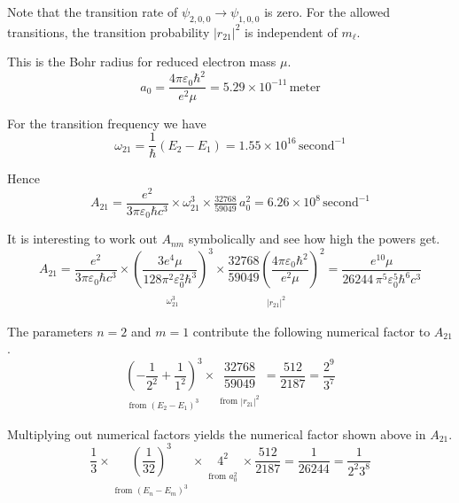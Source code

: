 \documentclass[12pt]{article}
\begin{document}
\medskip
\noindent
Note that the transition rate of $\psi_{2,0,0}\rightarrow\psi_{1,0,0}$ is zero.
For the allowed transitions, the transition probability
$|r_{21}|^2$ is independent of $m_\ell$.

\bigskip
\noindent
This is the Bohr radius for reduced electron mass $\mu$.
\begin{equation*}
a_0=\frac{4\pi\varepsilon_0\hbar^2}{e^2 \mu}
=5.29\times10^{-11}\,\text{meter}
\end{equation*}

\bigskip
\noindent
For the transition frequency we have
\begin{equation*}
\omega_{21}=\frac{1}{\hbar}(E_2-E_1)
=1.55\times10^{16}\,\text{second}^{-1}
\end{equation*}

\noindent
Hence
\begin{equation*}
A_{21}=\frac{e^2}{3\pi\varepsilon_0\hbar c^3}
\times
\omega_{21}^3
\times
\tfrac{32768}{59049}\,a_0^2
=6.26\times10^8\,\text{second}^{-1}
\end{equation*}

\noindent
It is interesting to work out $A_{nm}$ symbolically and see how high the powers get.
\begin{equation*}
A_{21}=\frac{e^2}{3\pi\varepsilon_0\hbar c^3}
\times
\underset{\substack{\\[1ex]\omega_{21}^3}}
{\left(\frac{3e^4\mu}{128\pi^2\varepsilon_0^2\hbar^3}\right)^3}
\times
\underset{\substack{\\[1ex]|r_{21}|^2}}
{\frac{32768}{59049}
\left(\frac{4\pi\varepsilon_0\hbar^2}{e^2\mu}\right)^2}
=\frac{e^{10}\mu}{26244\,\pi^5\varepsilon_0^5\hbar^6 c^3}
\end{equation*}

\noindent
The parameters $n=2$ and $m=1$ contribute the following numerical factor to $A_{21}$.
\begin{equation*}
\underset{\substack{\\[1ex]\text{from $(E_2-E_1)^3$}}}
{\left(-\frac{1}{2^2}+\frac{1}{1^2}\right)^3}
\times
\underset{\substack{\\[1ex]\text{from $|r_{21}|^2$}}}
{\frac{32768}{59049}}
=\frac{512}{2187}=\frac{2^9}{3^7}
\end{equation*}

\noindent
Multiplying out numerical factors yields the numerical factor shown above in $A_{21}$.
\begin{equation*}
\frac{1}{3}
\times
\underset{\substack{\\[1ex]\text{from $(E_n-E_m)^3$}}}
{\left(\frac{1}{32}\right)^3}
\times
\underset{\substack{\\[1ex]\text{from $a_0^2$}}}{4^2}
\times\frac{512}{2187}=\frac{1}{26244}=\frac{1}{2^2 3^8}
\end{equation*}
\end{document}
